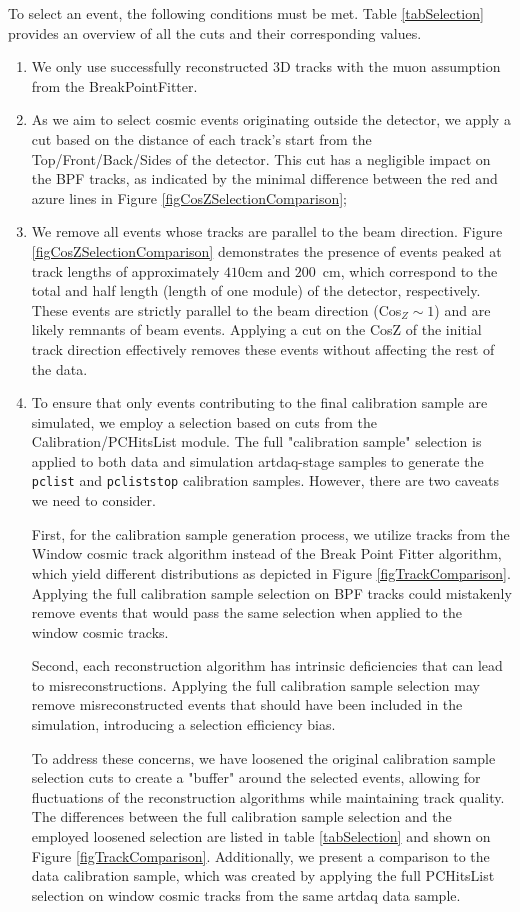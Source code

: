 \documentclass[12pt]{article}
\begin{document}
To select an event, the following conditions must be met. Table \ref{tabSelection} provides an overview of all the cuts and their corresponding values.
\begin{enumerate}
\item We only use successfully reconstructed 3D tracks with the muon assumption from the BreakPointFitter.
\item As we aim to select cosmic events originating outside the detector, we apply a cut based on the distance of each track's start from the Top/Front/Back/Sides of the detector. This cut has a negligible impact on the BPF tracks, as indicated by the minimal difference between the red and azure lines in Figure \ref{figCosZSelectionComparison};
\item We remove all events whose tracks are parallel to the beam direction. Figure \ref{figCosZSelectionComparison} demonstrates the presence of events peaked at track lengths of approximately $410$cm and $200$~cm, which correspond to the total and half length (length of one module) of the detector, respectively. These events are strictly parallel to the beam direction (Cos$_Z\sim 1$) and are likely remnants of beam events. Applying a cut on the CosZ of the initial track direction effectively removes these events without affecting the rest of the data.
\item To ensure that only events contributing to the final calibration sample are simulated, we employ a selection based on cuts from the Calibration/PCHitsList module. The full "calibration sample" selection is applied to both data and simulation artdaq-stage samples to generate the \texttt{pclist} and \texttt{pcliststop} calibration samples. However, there are two caveats we need to consider.

First, for the calibration sample generation process, we utilize tracks from the Window cosmic track algorithm instead of the Break Point Fitter algorithm, which yield different distributions as depicted in Figure \ref{figTrackComparison}. Applying the full calibration sample selection on BPF tracks could mistakenly remove events that would pass the same selection when applied to the window cosmic tracks.

Second, each reconstruction algorithm has intrinsic deficiencies that can lead to misreconstructions. Applying the full calibration sample selection may remove misreconstructed events that should have been included in the simulation, introducing a selection efficiency bias.

To address these concerns, we have loosened the original calibration sample selection cuts to create a "buffer" around the selected events, allowing for fluctuations of the reconstruction algorithms while maintaining track quality. The differences between the full calibration sample selection and the employed loosened selection are listed in table \ref{tabSelection} and shown on Figure \ref{figTrackComparison}. Additionally, we present a comparison to the data calibration sample, which was created by applying the full PCHitsList selection on window cosmic tracks from the same artdaq data sample.
\end{enumerate}
\end{document}
